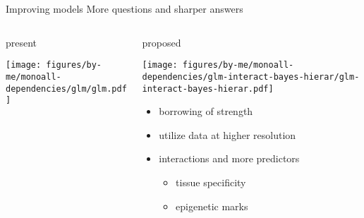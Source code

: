 \documentclass{beamer}
\newcommand{\platefigscale}[0]{0.7}
\begin{document}
\begin{frame}{Improving models}
{More questions and sharper answers}
\begin{columns}[t]
\begin{column}{0.4\textwidth}
present

\texttt{[image: figures/by-me/monoall-dependencies/glm/glm.pdf]}
\end{column}

\begin{column}{0.6\textwidth}
proposed

\texttt{[image: figures/by-me/monoall-dependencies/glm-interact-bayes-hierar/glm-interact-bayes-hierar.pdf]}
\begin{itemize}
\item borrowing of strength
\item utilize data at higher resolution
\item interactions and more predictors
\begin{itemize}
\item tissue specificity
\item epigenetic marks 
\end{itemize}
\end{itemize}
\end{column}
\end{columns}

\end{frame}



\end{document}
